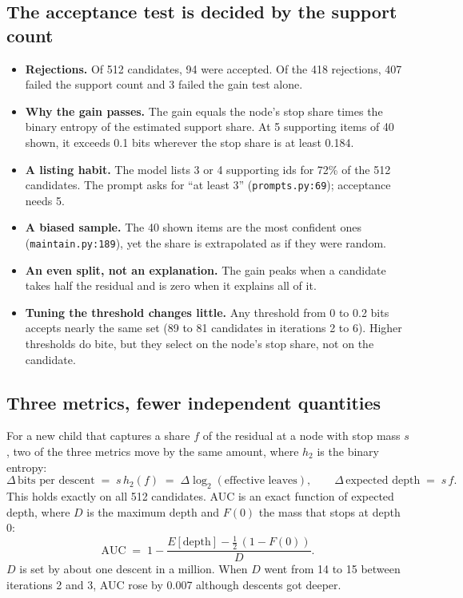 \documentclass[10pt,a4paper]{article}
\newcommand{\code}[1]{\texttt{#1}}
\begin{document}
\subsection{The acceptance test is decided by the support count}
\begin{itemize}
\item \textbf{Rejections.} Of 512 candidates, 94 were accepted. Of the 418 rejections, 407 failed the support count and 3 failed the gain test alone.
\item \textbf{Why the gain passes.} The gain equals the node's stop share times the binary entropy of the estimated support share. At 5 supporting items of 40 shown, it exceeds 0.1 bits wherever the stop share is at least 0.184.
\item \textbf{A listing habit.} The model lists 3 or 4 supporting ids for 72\% of the 512 candidates. The prompt asks for ``at least 3'' (\code{prompts.py:69}); acceptance needs 5.
\item \textbf{A biased sample.} The 40 shown items are the most confident ones (\code{maintain.py:189}), yet the share is extrapolated as if they were random.
\item \textbf{An even split, not an explanation.} The gain peaks when a candidate takes half the residual and is zero when it explains all of it.
\item \textbf{Tuning the threshold changes little.} Any threshold from 0 to 0.2 bits accepts nearly the same set (89 to 81 candidates in iterations 2 to 6). Higher thresholds do bite, but they select on the node's stop share, not on the candidate.
\end{itemize}

\subsection{Three metrics, fewer independent quantities}

For a new child that captures a share $f$ of the residual at a node with stop mass $s$, two of the three
metrics move by the same amount, where $h_2$ is the binary entropy:
\begin{equation}
\Delta\,\text{bits per descent} \;=\; s\,h_2(f) \;=\; \Delta \log_2(\text{effective leaves}),
\qquad \Delta\,\text{expected depth} \;=\; s\,f .
\end{equation}
This holds exactly on all 512 candidates. AUC is an exact function of expected depth, where $D$ is the
maximum depth and $F(0)$ the mass that stops at depth 0:
\begin{equation}
\text{AUC} \;=\; 1 - \frac{E[\text{depth}] - \tfrac12\,(1 - F(0))}{D}.
\end{equation}
$D$ is set by about one descent in a million. When $D$ went from 14 to 15 between iterations 2 and 3, AUC rose
by 0.007 although descents got deeper.
\end{document}
